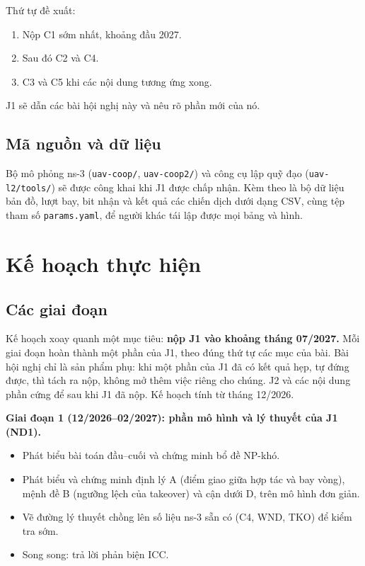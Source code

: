Thứ tự đề xuất:

\begin{enumerate}
\def\labelenumi{\arabic{enumi}.}
\tightlist
\item
  Nộp C1 sớm nhất, khoảng đầu 2027.
\item
  Sau đó C2 và C4.
\item
  C3 và C5 khi các nội dung tương ứng xong.
\end{enumerate}

J1 sẽ dẫn các bài hội nghị này và nêu rõ phần mới của nó.

\subsection{Mã nguồn và dữ liệu}

Bộ mô phỏng ns-3 (\texttt{uav-coop/}, \texttt{uav-coop2/}) và công cụ
lập quỹ đạo (\texttt{uav-l2/tools/}) sẽ được công khai khi J1 được chấp
nhận. Kèm theo là bộ dữ liệu bản đồ, lượt bay, bit nhận và kết quả các
chiến dịch dưới dạng CSV, cùng tệp tham số \texttt{params.yaml}, để
người khác tái lập được mọi bảng và hình.

\section{Kế hoạch thực hiện}

\subsection{Các giai đoạn}

Kế hoạch xoay quanh một mục tiêu: \textbf{nộp J1 vào khoảng tháng
07/2027.} Mỗi giai đoạn hoàn thành một phần của J1, theo đúng thứ tự các
mục của bài. Bài hội nghị chỉ là sản phẩm phụ: khi một phần của J1 đã có
kết quả hẹp, tự đứng được, thì tách ra nộp, không mở thêm việc riêng cho
chúng. J2 và các nội dung phần cứng để sau khi J1 đã nộp. Kế hoạch tính
từ tháng 12/2026.

\textbf{Giai đoạn 1 (12/2026--02/2027): phần mô hình và lý thuyết của J1
(ND1).}

\begin{itemize}
\tightlist
\item
  Phát biểu bài toán đầu--cuối và chứng minh bổ đề NP-khó.
\item
  Phát biểu và chứng minh định lý A (điểm giao giữa hợp tác và bay
  vòng), mệnh đề B (ngưỡng lệch của takeover) và cận dưới D, trên mô
  hình đơn giản.
\item
  Vẽ đường lý thuyết chồng lên số liệu ns-3 sẵn có (C4, WND, TKO) để
  kiểm tra sớm.
\item
  Song song: trả lời phản biện ICC.
\end{itemize}

